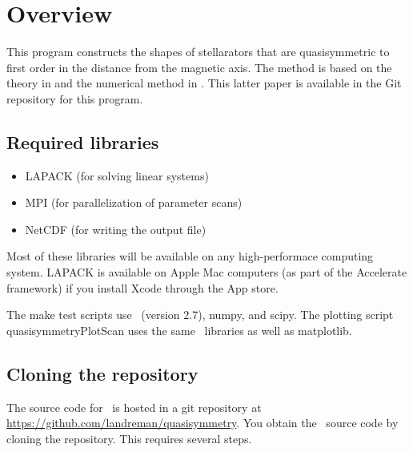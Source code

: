 \chapter{Overview}

This program constructs the shapes of stellarators that are quasisymmetric to first
order in the distance from the magnetic axis.
The method is based on the theory in \cite{GB1,GB2}
and the numerical method in \cite{PaperII}.
This latter paper is available in the Git repository for this program.



\section{Required libraries}

\begin{itemize}

\item {\ttfamily LAPACK} (for solving linear systems)
\item {\ttfamily MPI} (for parallelization of parameter scans)
\item {\ttfamily NetCDF} (for writing the output file)

\end{itemize}

Most of these libraries will be available on any high-performace computing system. {\ttfamily LAPACK}
is available on Apple Mac computers (as part of the Accelerate framework) if you install Xcode through the App store.

The {\ttfamily make test} scripts use \python~(version 2.7),
{\ttfamily numpy}, and {\ttfamily scipy}.
The plotting script {\ttfamily quasisymmetryPlotScan} uses the same \python~libraries
as well as {\ttfamily matplotlib}.

\section{Cloning the repository}

The source code for \quasisymmetry~is hosted in a {\ttfamily git} repository at
\url{https://github.com/landreman/quasisymmetry}.
You obtain the \quasisymmetry~source code by cloning the repository. This requires several steps.

